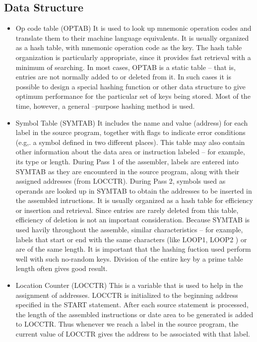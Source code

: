 \documentclass[a4paper,12pt]{extarticle}
\begin{document}
	\subsection{Data Structure}
	\begin{itemize}
		\item Op code table (OPTAB) \newline
		It is used to look up mnemonic operation codes and translate them to their machine language equivalents. It is usually organized as a hash table, with mnemonic operation code as the key. The hash table organization is particularly appropriate, since it provides fast retrieval with a minimum of searching. In most cases, OPTAB is a static table – that is, entries are not normally added to or deleted from it. In such cases it is possible to design a special hashing function or other data structure to give optimum performance for the particular set of keys being stored. Most of the time, however, a general –purpose hashing method is used. 
		\item Symbol Table (SYMTAB) \newline
		It includes the name and value (address) for each label in the source program, together with flags to indicate error conditions (e.g,. a symbol defined in two different places). This table may also contain other information about the data area or instruction labeled – for example, its type or length. During Pass 1 of the assembler, labels are entered into SYMTAB as they are encounterd in the source program, along with their assigned addresses (from LOCCTR). During Pass 2, symbols used as operands are looked up in SYMTAB to obtain the addresses to be inserted in the assembled intructions. It is usually organized as a hash table for efficiency or insertion and retrieval. Since entries are rarely deleted from this table, efficiency of deletion is not an important consideration. Because SYMTAB is used havily throughout the assemble, similar characteristics – for example, labels that start or end with the same characters (like LOOP1, LOOP2 ) or are of the same length. It is important that the hashing fuction used perform well with such no-random keys. Division of the entire key by a prime table length often gives good result. 
		\item Location Counter (LOCCTR) \newline
		This is a variable that is used to help in the assignment of addresses. LOCCTR is initialized to the beginning address specified in the START statement. After each source statement is processed, the length of the assembled instructions or date area to be generated is added to LOCCTR. Thus whenever we reach a label in the source program, the current value of LOCCTR gives the address to be associated with that label. 
	\end{itemize}
\end{document}
